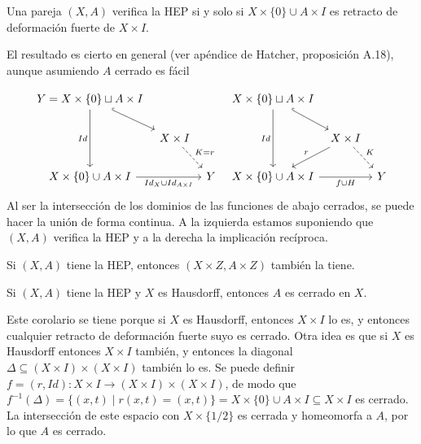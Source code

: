 \documentclass[TA.tex]{subfiles}
\begin{document}
\begin{prop}
Una pareja $(X,A)$ verifica la HEP si y solo si $X\times\{0\}\cup A\times I$ es retracto de deformación fuerte de $X\times I$. 
\end{prop}
El resultado es cierto en general (ver apéndice de Hatcher, proposición A.18), aunque asumiendo $A$ cerrado es fácil

\[
\begin{tikzcd}[column sep=tiny]
Y=X\times\{0\}\sqcup A\times I\arrow[dd, "Id"']\arrow[dr, hookrightarrow] & & & X\times\{0\}\sqcup A\times I\arrow[dd, "Id"']\arrow[dr, hookrightarrow]& &\\
& X\times I\arrow[dr, dashed, "K=r"] & & & X\times I\arrow[ dl, "r"']\arrow[dr, dashed, "K"] &\\
X\times\{0\}\cup A\times I\arrow[rr, "Id_X\cup Id_{A\times I}"'] & &Y & X\times\{0\}\cup A\times I\arrow[rr, "f\cup H"'] & &Y
\end{tikzcd}
\]
Al ser la intersección de los dominios de las funciones de abajo cerrados, se puede hacer la unión de forma continua. A la izquierda estamos suponiendo que $(X,A)$ verifica la HEP y a la derecha la implicación recíproca. 


\begin{coro}
Si $(X,A)$ tiene la HEP, entonces $(X\times Z, A\times Z)$ también la tiene.
\end{coro}

\begin{coro}
Si $(X,A)$ tiene la HEP y $X$ es Hausdorff, entonces $A$ es cerrado en $X$. 
\end{coro}
Este corolario se tiene porque si $X$ es Hausdorff, entonces $X\times I$ lo es, y entonces cualquier retracto de deformación fuerte suyo es cerrado. Otra idea es que si $X$ es Hausdorff entonces $X\times I$ también, y  entonces la diagonal $\Delta\subseteq (X\times I)\times(X\times I)$ también lo es. Se puede definir $f=(r,Id):X\times I\to  (X\times I)\times(X\times I)$, de modo que $f^{-1}(\Delta)=\{(x,t)\mid r(x,t)=(x,t)\}=X\times\{0\}\cup A\times I\subseteq X\times I$ es cerrado. La intersección de este espacio con $X\times\{1/2\}$ es cerrada y homeomorfa a $A$, por lo que $A$ es cerrado. 
\end{document}
